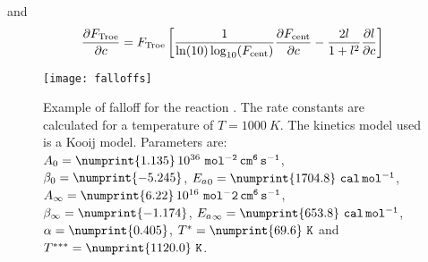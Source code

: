 and
\begin{equation}
\doverdc{\FTroe} = \FTroe \left[
                                  \frac{1}{\ln(10)\log_{10}(\TroeFcent)}\doverdc{\TroeFcent}
                                - \frac{2 l}{1 + l^2} \doverdc{l}
                          \right]
\end{equation}
\begin{figure}
\centering
\texttt{[image: falloffs]}
\caption{\label{kinetics::falloffs}%
Example of falloff for the reaction .
The rate constants are calculated for a temperature of $T = 1000~\unit{K}$. The kinetics model
used is a Kooij model. Parameters are:
$\PreExp_0      = \numprint{1.135}\,10^{36}~\unit{mol^{-2}\,cm^6\,s^{-1}}$,
$\Power_0       = \numprint{-5.245}$,
$\AcEn_0        = \numprint{1704.8}~\unit{cal\,mol^{-1}}$,
$\PreExp_\infty = \numprint{6.22}\,10^{16}~\unit{mol^-2\,cm^6\,s^{-1}}$,
$\Power_\infty  = \numprint{-1.174}$,
$\AcEn_\infty   = \numprint{653.8}~\unit{cal\,mol^{-1}}$,
$\Troealpha     = \numprint{0.405}$,
$\TroeTone      = \numprint{69.6}~\unit{K}$ and
$\TroeTthree    = \numprint{1120.0}~\unit{K}$.}
\end{figure}
